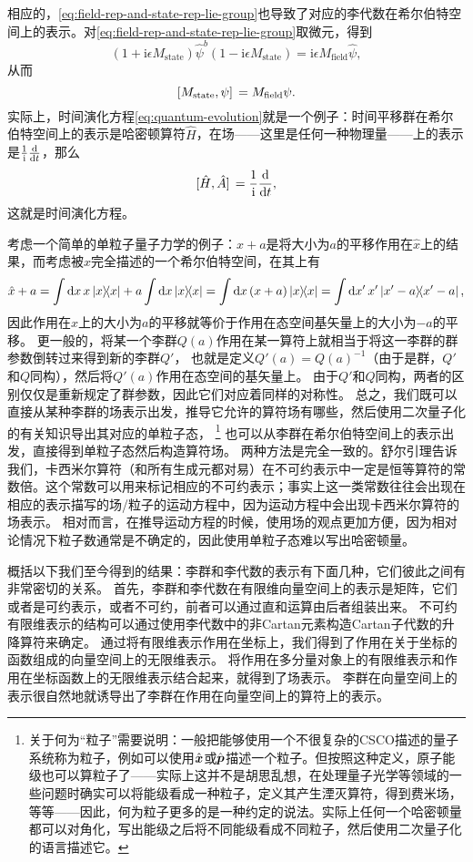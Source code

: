 \documentclass[hyperref, UTF8, a4paper]{ctexart}
\newcommand*{\ii}{\mathrm{i}}
\begin{document}
相应的，\eqref{eq:field-rep-and-state-rep-lie-group}也导致了对应的李代数在希尔伯特空间上的表示。对\eqref{eq:field-rep-and-state-rep-lie-group}取微元，得到
\[
    (1 + \ii \epsilon M_\text{state}) \hat{\psi}^b (1 - \ii \epsilon M_\text{state}) = \ii \epsilon M_\text{field} \hat{\psi},
\]
从而
\begin{equation}
    \comm*{M_\text{state}}{\psi} = M_\text{field} \psi.
    \label{eq:field-rep-and-state-rep-gen}
\end{equation}
实际上，时间演化方程\eqref{eq:quantum-evolution}就是一个例子：时间平移群在希尔伯特空间上的表示是哈密顿算符$\hat{H}$，在场——这里是任何一种物理量——上的表示是$\frac{1}{\ii} \dv{t}$，那么
\[
    \comm*{\hat{H}}{\hat{A}} = \frac{1}{\ii} \dv{t},
\]
这就是时间演化方程。

考虑一个简单的单粒子量子力学的例子：$\hat{x} + a$是将大小为$a$的平移作用在$\hat{x}$上的结果，而考虑被$\hat{x}$完全描述的一个希尔伯特空间，在其上有
\[
    \hat{x} + a = \int \dd{x} x \dyad{x} + a \int \dd{x} \dyad{x} 
    = \int \dd{x} (x + a) \dyad{x} = \int \dd{x'} x' \dyad{x'-a},
\]
因此作用在$\hat{x}$上的大小为$a$的平移就等价于作用在态空间基矢量上的大小为$-a$的平移。
更一般的，将某一个李群$Q(a)$作用在某一算符上就相当于将这一李群的群参数倒转过来得到新的李群$Q'$，
也就是定义$Q'(a) = Q(a)^{-1}$（由于是群，$Q'$和$Q$同构），然后将$Q'(a)$作用在态空间的基矢量上。
由于$Q'$和$Q$同构，两者的区别仅仅是重新规定了群参数，因此它们对应着同样的对称性。
总之，我们既可以直接从某种李群的场表示出发，推导它允许的算符场有哪些，然后使用二次量子化的有关知识导出其对应的单粒子态，%
\footnote{关于何为“粒子”需要说明：一般把能够使用一个不很复杂的CSCO描述的量子系统称为粒子，例如可以使用$\hat{\vb*{x}}$或$\hat{\vb*{p}}$描述一个粒子。但按照这种定义，原子能级也可以算粒子了——实际上这并不是胡思乱想，在处理量子光学等领域的一些问题时确实可以将能级看成一种粒子，定义其产生湮灭算符，得到费米场，等等——因此，何为粒子更多的是一种约定的说法。实际上任何一个哈密顿量都可以对角化，写出能级之后将不同能级看成不同粒子，然后使用二次量子化的语言描述它。}%
也可以从李群在希尔伯特空间上的表示出发，直接得到单粒子态然后构造算符场。
两种方法是完全一致的。舒尔引理告诉我们，卡西米尔算符（和所有生成元都对易）在不可约表示中一定是恒等算符的常数倍。这个常数可以用来标记相应的不可约表示；事实上这一类常数往往会出现在相应的表示描写的场/粒子的运动方程中，因为运动方程中会出现卡西米尔算符的场表示。
相对而言，在推导运动方程的时候，使用场的观点更加方便，因为相对论情况下粒子数通常是不确定的，因此使用单粒子态难以写出哈密顿量。

概括以下我们至今得到的结果：李群和李代数的表示有下面几种，它们彼此之间有非常密切的关系。
首先，李群和李代数在有限维向量空间上的表示是矩阵，它们或者是可约表示，或者不可约，前者可以通过直和运算由后者组装出来。
不可约有限维表示的结构可以通过使用李代数中的非Cartan元素构造Cartan子代数的升降算符来确定。
通过将有限维表示作用在坐标上，我们得到了作用在关于坐标的函数组成的向量空间上的无限维表示。
将作用在多分量对象上的有限维表示和作用在坐标函数上的无限维表示结合起来，就得到了场表示。
李群在向量空间上的表示很自然地就诱导出了李群在作用在向量空间上的算符上的表示。
\end{document}
